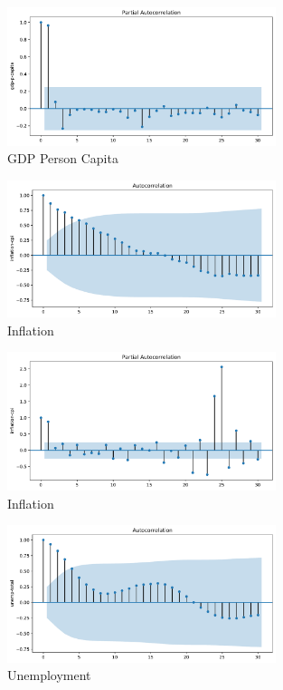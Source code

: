 \begin{figure}[H]
    \centering
    \includegraphics[width=0.7\textwidth]{Images/gdp-p-capita_PAcorr.pdf}
    \caption{GDP Person Capita}
    \label{fig1}
\end{figure}


\begin{figure}[H]
    \centering
    \includegraphics[width=0.7\textwidth]{Images/inflation-cpi_Acorr.pdf}
    \caption{Inflation}
    \label{fig1}
\end{figure}


\begin{figure}[H]
    \centering
    \includegraphics[width=0.7\textwidth]{Images/inflation-cpi_PAcorr.pdf}
    \caption{Inflation}
    \label{fig1}
\end{figure}

\begin{figure}[H]
    \centering
    \includegraphics[width=0.7\textwidth]{Images/unemp-total_Acorr.pdf}
    \caption{Unemployment}
    \label{fig1}
\end{figure}

